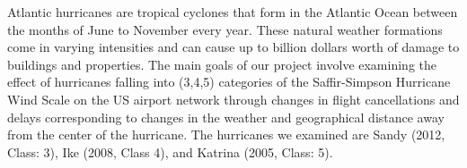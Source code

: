 
Atlantic hurricanes are tropical cyclones that form in the Atlantic Ocean between the months of June to November every year. These natural weather formations come in varying intensities and can cause up to billion dollars worth of damage to buildings and properties. The main goals of our project involve examining the effect of hurricanes falling into (3,4,5) categories of the Saffir-Simpson Hurricane Wind Scale on the US airport network through changes in flight cancellations and delays corresponding to changes in the weather and geographical distance away from the center of the hurricane. The hurricanes we examined are Sandy (2012, Class: 3), Ike (2008, Class 4), and Katrina (2005, Class: 5). 